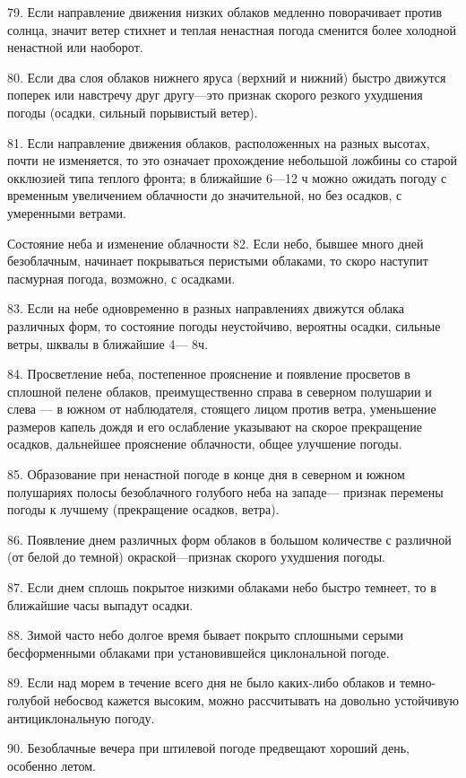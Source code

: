 79. Если направление движения низких облаков медленно поворачивает против солнца, значит ветер стихнет и теплая ненастная погода сменится более холодной ненастной или наоборот.

80. Если два слоя облаков нижнего яруса (верхний и нижний) быстро движутся поперек или навстречу друг другу—это признак скорого резкого ухудшения погоды (осадки, сильный порывистый ветер).

81. Если направление движения облаков, расположенных на разных высотах, почти не изменяется, то это означает прохождение небольшой ложбины со старой окклюзией типа теплого фронта; в ближайшие 6—12 ч можно ожидать погоду с временным увеличением облачности до значительной, но без осадков, с умеренными ветрами.

Состояние неба и изменение облачности
82. Если небо, бывшее много дней безоблачным, начинает покрываться перистыми облаками, то скоро наступит пасмурная погода, возможно, с осадками.

83. Если на небе одновременно в разных направлениях движутся облака различных форм, то состояние погоды неустойчиво, вероятны осадки, сильные ветры, шквалы в ближайшие 4— 8ч.

84. Просветление неба, постепенное прояснение и появление просветов в сплошной пелене облаков, преимущественно справа в северном полушарии и слева — в южном от наблюдателя, стоящего лицом против ветра, уменьшение размеров капель дождя и его ослабление указывают на скорое прекращение осадков, дальнейшее прояснение облачности, общее улучшение погоды.

85. Образование при ненастной погоде в конце дня в северном и южном полушариях полосы безоблачного голубого неба на западе— признак перемены погоды к лучшему (прекращение осадков, ветра).

86. Появление днем различных форм облаков в большом количестве с различной (от белой до темной) окраской—признак скорого ухудшения погоды.

87. Если днем сплошь покрытое низкими облаками небо быстро темнеет, то в ближайшие часы выпадут осадки.

88. Зимой часто небо долгое время бывает покрыто сплошными серыми бесформенными облаками при установившейся циклональной погоде.

89. Если над морем в течение всего дня не было каких-либо облаков и темно-голубой небосвод кажется высоким, можно рассчитывать на довольно устойчивую антициклональную погоду.

90. Безоблачные вечера при штилевой погоде предвещают хороший день, особенно летом.

